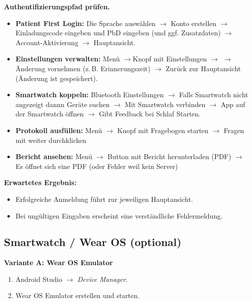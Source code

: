\textbf{Authentifizierungspfad prüfen.}

\begin{itemize}
  \item \textbf{Patient First Login:} Die Sprache auswählen $\rightarrow$ Konto erstellen $\rightarrow$ Einladungscode eingeben und PbD eingeben (und ggf. Zusatzdaten) $\rightarrow$ Account-Aktivierung $\rightarrow$ Hauptansicht.
  
  \item \textbf{Einstellungen verwalten:} Menü $\rightarrow$Knopf mit  Einstellungen $\rightarrow$ $\rightarrow$ Änderung vornehmen (z.\,B. Erinnerungszeit) $\rightarrow$ Zurück zur Hauptansicht (Änderung ist gespeichert).

  \item \textbf{Smartwatch koppeln:} Bluetooth Einstellungen $\rightarrow$ Falls Smartwatch nicht angezeigt dannn Geräte suchen $\rightarrow$ Mit Smartwatch verbinden $\rightarrow$ App auf der Smartwatch öffnen $\rightarrow$ Gibt Feedback bei Schlaf Starten.

  \item \textbf{Protokoll ausfüllen:} Menü $\rightarrow$ Knopf mit Fragebogen starten $\rightarrow$ Fragen mit weiter durchklicken

  \item \textbf{Bericht ansehen:} Menü $\rightarrow$ Button mit Bericht herunterladen (PDF) $\rightarrow$ Es öffnet sich eine PDF (oder Fehler weil kein Server)
\end{itemize}

\textbf{Erwartetes Ergebnis:}
\begin{itemize}
  \item Erfolgreiche Anmeldung führt zur jeweiligen Hauptansicht.
  \item Bei ungültigen Eingaben erscheint eine verständliche Fehlermeldung.
\end{itemize}
\bigskip

\subsection{Smartwatch / Wear OS (optional)}

\textbf{Variante A: Wear OS Emulator}
\begin{enumerate}
  \item Android Studio $\rightarrow$ \emph{Device Manager}.
  \item Wear OS Emulator erstellen und starten.
\end{enumerate}

